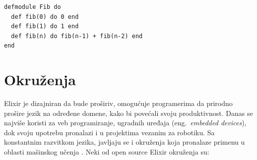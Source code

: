 \documentclass[a4paper]{article}
\begin{document}
\begin{lstlisting}[caption={Fibonačijev niz},frame=none, label=simple]
defmodule Fib do 
  def fib(0) do 0 end
  def fib(1) do 1 end
  def fib(n) do fib(n-1) + fib(n-2) end
end
\end{lstlisting}



\section{Okruženja} 
Elixir je dizajniran da bude proširiv, omogućuje programerima da prirodno prošire jezik na određene domene, kako bi povećali svoju produktivnost. Danas se najviše koristi za veb programiranje, ugradnih uređaja (eng.~{\em embedded devices}), dok svoju upotrebu pronalazi i u projektima vezanim za robotiku. Sa konstantnim razvitkom jezika, javljaju se i okruženja koja pronalaze primenu u oblasti mašinskog učenja \cite{confNIPS}.
Neki od open source Elixir okruženja su:
\end{document}
